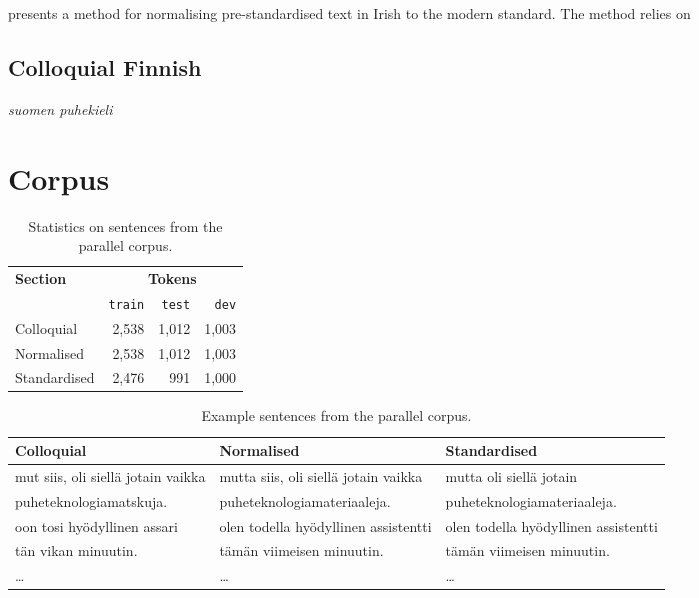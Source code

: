 \documentclass[11pt]{article}
\begin{document}
 presents a method for normalising pre-standardised text in Irish to 
the modern standard. The method relies on 

\subsection{Colloquial Finnish}

 \emph{suomen puhekieli}

\section{Corpus}

\begin{table}
  \centering
 \begin{tabular}{|l|r|r|r|}
    \hline
    \multirow{2}{*}{\textbf{Section}} & \multicolumn{3}{|c|}{\textbf{Tokens}} \\\cline{2-4}
                                      & \texttt{train} & \texttt{test} & \texttt{dev} \\
    \hline
    Colloquial                           & 2,538 & 1,012 & 1,003 \\ 
    Normalised                           & 2,538 & 1,012 & 1,003 \\ 
    Standardised                         & 2,476 & 991 & 1,000 \\
    \hline
 \end{tabular} 
  \caption{Statistics on sentences from the parallel corpus.}
  \label{table:corpsize}
\end{table}

\begin{table*}
  \centering
  \begin{tabular}{|l|l|l|}
  \hline
  \textbf{Colloquial} & \textbf{Normalised} & \textbf{Standardised} \\
  \hline
  mut siis, oli siell\"{a} jotain vaikka     & mutta siis, oli siell\"{a} jotain vaikka     & mutta oli siell\"{a} jotain     \\
  puheteknologiamatskuja.  & puheteknologiamateriaaleja. & puheteknologiamateriaaleja.  \\
  \hline
  oon tosi hy\"{o}dyllinen assari     & olen todella hy\"{o}dyllinen assistentti & olen todella hy\"{o}dyllinen assistentti \\
  t\"{a}n vikan minuutin.           & t\"{a}m\"{a}n viimeisen minuutin.            & t\"{a}m\"{a}n viimeisen minuutin. \\
  \hline
  \ldots & \ldots & \ldots \\
  \hline
  \end{tabular}
  \caption{Example sentences from the parallel corpus.}
  \label{table:corpexample}
\end{table*}
\end{document}
